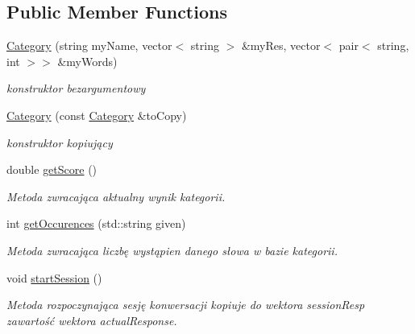 \subsection*{Public Member Functions}
\begin{DoxyCompactItemize}
\item 
\mbox{\hyperlink{class_category_a38c6bbecf5a7c111b9193baafbd77069}{Category}} (string my\+Name, vector$<$ string $>$ \&my\+Res, vector$<$ pair$<$ string, int $>$$>$ \&my\+Words)
\begin{DoxyCompactList}\small\item\em konstruktor bezargumentowy \end{DoxyCompactList}\item 
\mbox{\label{class_category_a385b798b4afd899a851c5bac8c8cd8b8}} 
\mbox{\hyperlink{class_category_a385b798b4afd899a851c5bac8c8cd8b8}{Category}} (const \mbox{\hyperlink{class_category}{Category}} \&to\+Copy)
\begin{DoxyCompactList}\small\item\em konstruktor kopiujący \end{DoxyCompactList}\item 
\mbox{\label{class_category_a43d0a4f0879fdf3f2ca85a5829f6346d}} 
double \mbox{\hyperlink{class_category_a43d0a4f0879fdf3f2ca85a5829f6346d}{get\+Score}} ()
\begin{DoxyCompactList}\small\item\em Metoda zwracająca aktualny wynik kategorii. \end{DoxyCompactList}\item 
int \mbox{\hyperlink{class_category_a00b8f20f09b39bb7b5e519295538605a}{get\+Occurences}} (std\+::string given)
\begin{DoxyCompactList}\small\item\em Metoda zwracająca liczbę wystąpien danego słowa w bazie kategorii. \end{DoxyCompactList}\item 
\mbox{\label{class_category_a0172b590f4ffb1816288813492c3f2d0}} 
void \mbox{\hyperlink{class_category_a0172b590f4ffb1816288813492c3f2d0}{start\+Session}} ()
\begin{DoxyCompactList}\small\item\em Metoda rozpoczynająca sesję konwersacji kopiuje do wektora session\+Resp zawartość wektora actual\+Response. \end{DoxyCompactList}\item 
$$
\end{DoxyCompactItemize}
